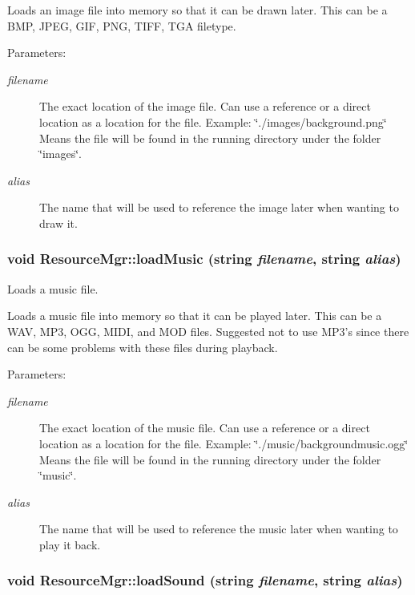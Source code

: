Loads an image file into memory so that it can be drawn later. This can be a BMP, JPEG, GIF, PNG, TIFF, TGA filetype. \begin{Desc}
\item[Parameters:]
\begin{description}
\item[{\em filename}]The exact location of the image file. Can use a reference or a direct location as a location for the file. Example: \char`\"{}./images/background.png\char`\"{} Means the file will be found in the running directory under the folder \char`\"{}images\char`\"{}. \item[{\em alias}]The name that will be used to reference the image later when wanting to draw it. \end{description}
\end{Desc}
\hypertarget{class_resource_mgr_3511f45844dc761fce18bcbb490b2782}{
\subsubsection[{loadMusic}]{\setlength{\rightskip}{0pt plus 5cm}void ResourceMgr::loadMusic (string {\em filename}, \/  string {\em alias})}}
\label{class_resource_mgr_3511f45844dc761fce18bcbb490b2782}


Loads a music file. 

Loads a music file into memory so that it can be played later. This can be a WAV, MP3, OGG, MIDI, and MOD files. Suggested not to use MP3's since there can be some problems with these files during playback. \begin{Desc}
\item[Parameters:]
\begin{description}
\item[{\em filename}]The exact location of the music file. Can use a reference or a direct location as a location for the file. Example: \char`\"{}./music/backgroundmusic.ogg\char`\"{} Means the file will be found in the running directory under the folder \char`\"{}music\char`\"{}. \item[{\em alias}]The name that will be used to reference the music later when wanting to play it back. \end{description}
\end{Desc}
\hypertarget{class_resource_mgr_b77815b1a5db3d233a519a65c129c6f5}{
\subsubsection[{loadSound}]{\setlength{\rightskip}{0pt plus 5cm}void ResourceMgr::loadSound (string {\em filename}, \/  string {\em alias})}}
\label{class_resource_mgr_b77815b1a5db3d233a519a65c129c6f5}


